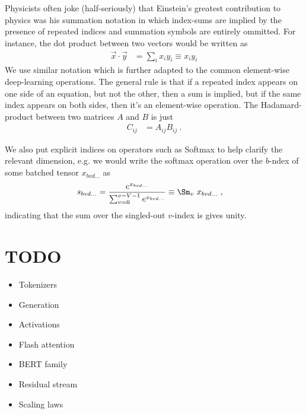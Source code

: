 \documentclass[11pt]{article}
\begin{document}
Physicists often joke (half-seriously) that Einstein's greatest contribution to physics was his
summation notation in which index-sums are implied by the presence of repeated indices and summation
symbols are entirely ommitted. For instance, the dot product between two vectors would be written as
\begin{align}
    \vec{x} \cdot \vec{y} &= \sum _{ i } x _{ i } y _{ i } \equiv x _{ i } y _{  i }
    \label{app:eq:einstein_sum}
\end{align}
We use similar notation which is further adapted to the common element-wise deep-learning
operations.  The general rule is that if a repeated index appears on one side of an equation, but
not the other, then a sum is implied, but if the same index appears on both sides, then it's an
element-wise operation. The Hadamard-product between two matrices $ A $ and $ B $ is just
\begin{align}
  C _{ ij } &= A _{ ij } B _{ ij }\ .
\end{align}

 We also put explicit indices on operators such as Softmax to help clarify the relevant
 dimension, e.g. we would write the softmax operation over the $ b $-ndex of some batched
 tensor $ x _{ bvd\ldots } $ as
 \begin{align}
     s _{ bvd\ldots } &= \frac{ e^{ x _{ bv d\ldots}  } }{ \sum _{ v = 0 } ^{  v= V-1 } e^{ x _{
     bvd\ldots } } } \equiv
     \Sm _{ v } \ x _{ bvd\ldots }
     \ , \label{app:eq:einstein_softmax}
 \end{align}
 indicating that the sum over the singled-out $ v $-index is gives unity.



 \section{TODO}


 \begin{itemize}
 \item Tokenizers
 \item Generation
 \item Activations
 \item Flash attention
 \item BERT family
 \item Residual stream
 \item Scaling laws
 \end{itemize}



\end{document}
